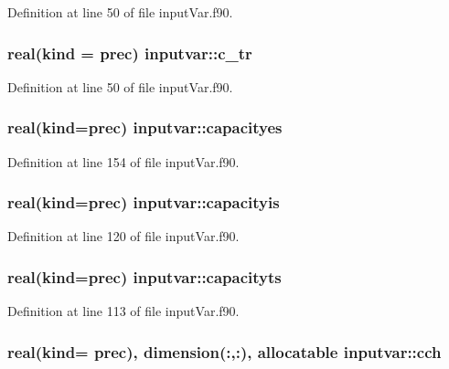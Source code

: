 Definition at line 50 of file input\-Var.\-f90.

\hypertarget{classinputvar_a52f3b90c5f4c7bb282ebc24e762032a2}{
\subsubsection[{c\-\_\-tr}]{\setlength{\rightskip}{0pt plus 5cm}real(kind = prec) inputvar\-::c\-\_\-tr}}\label{classinputvar_a52f3b90c5f4c7bb282ebc24e762032a2}


Definition at line 50 of file input\-Var.\-f90.

\hypertarget{classinputvar_a4160798c67ffa5c237c6a3febf2eb38f}{
\subsubsection[{capacityes}]{\setlength{\rightskip}{0pt plus 5cm}real(kind=prec) inputvar\-::capacityes}}\label{classinputvar_a4160798c67ffa5c237c6a3febf2eb38f}


Definition at line 154 of file input\-Var.\-f90.

\hypertarget{classinputvar_af73bb61794a02bc78ab1b1d648ce0c3d}{
\subsubsection[{capacityis}]{\setlength{\rightskip}{0pt plus 5cm}real(kind=prec) inputvar\-::capacityis}}\label{classinputvar_af73bb61794a02bc78ab1b1d648ce0c3d}


Definition at line 120 of file input\-Var.\-f90.

\hypertarget{classinputvar_aa1efd68463d126d8971abdafa06d3a33}{
\subsubsection[{capacityts}]{\setlength{\rightskip}{0pt plus 5cm}real(kind=prec) inputvar\-::capacityts}}\label{classinputvar_aa1efd68463d126d8971abdafa06d3a33}


Definition at line 113 of file input\-Var.\-f90.

\hypertarget{classinputvar_a88bb670dc0bca944104c292071818a36}{
\subsubsection[{cch}]{\setlength{\rightskip}{0pt plus 5cm}real(kind= prec), dimension(\-:,\-:), allocatable inputvar\-::cch}}\label{classinputvar_a88bb670dc0bca944104c292071818a36}


